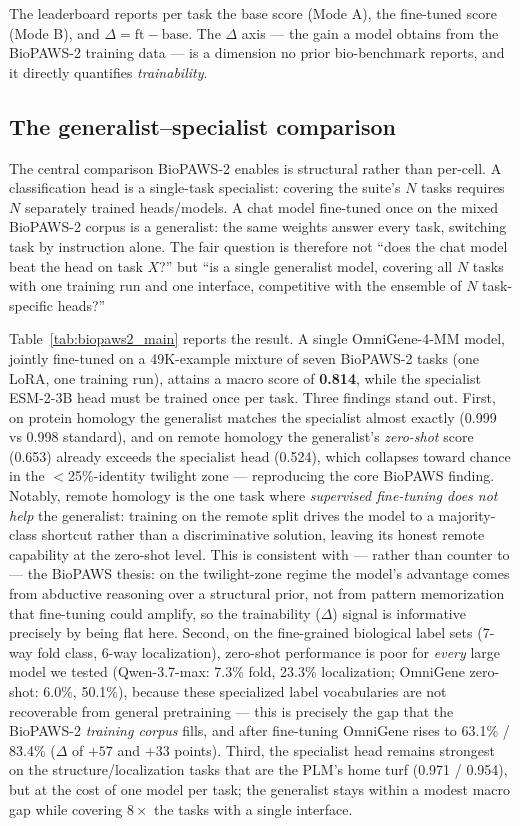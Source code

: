 The leaderboard reports per task the base score (Mode A), the fine-tuned score (Mode B),
and $\Delta = \text{ft} - \text{base}$. The $\Delta$ axis --- the gain a model obtains from
the BioPAWS-2 training data --- is a dimension no prior bio-benchmark reports, and it
directly quantifies \emph{trainability}.

\subsection{The generalist--specialist comparison}
\label{sec:biopaws2_generalist}

The central comparison BioPAWS-2 enables is structural rather than per-cell. A
classification head is a single-task specialist: covering the suite's $N$ tasks requires
$N$ separately trained heads/models. A chat model fine-tuned once on the mixed BioPAWS-2
corpus is a generalist: the same weights answer every task, switching task by instruction
alone. The fair question is therefore not ``does the chat model beat the head on task
$X$?'' but ``is a single generalist model, covering all $N$ tasks with one training run and
one interface, competitive with the ensemble of $N$ task-specific heads?''

Table~\ref{tab:biopaws2_main} reports the result. A single OmniGene-4-MM model, jointly
fine-tuned on a 49K-example mixture of seven BioPAWS-2 tasks (one LoRA, one training run),
attains a macro score of \textbf{0.814}, while the specialist ESM-2-3B head must be trained
once per task. Three findings stand out. First, on protein homology the generalist matches
the specialist almost exactly (0.999 vs 0.998 standard), and on remote homology the
generalist's \emph{zero-shot} score (0.653) already exceeds the specialist head (0.524),
which collapses toward chance in the $<$25\%-identity twilight zone --- reproducing the
core BioPAWS finding. Notably, remote homology is the one task where \emph{supervised
fine-tuning does not help} the generalist: training on the remote split drives the model to
a majority-class shortcut rather than a discriminative solution, leaving its honest remote
capability at the zero-shot level. This is consistent with --- rather than counter to ---
the BioPAWS thesis: on the twilight-zone regime the model's advantage comes from
abductive reasoning over a structural prior, not from pattern memorization that fine-tuning
could amplify, so the trainability ($\Delta$) signal is informative precisely by being flat
here. Second, on the fine-grained biological label sets (7-way fold class,
6-way localization), zero-shot performance is poor for \emph{every} large model we tested
(Qwen-3.7-max: 7.3\% fold, 23.3\% localization; OmniGene zero-shot: 6.0\%, 50.1\%), because
these specialized label vocabularies are not recoverable from general pretraining --- this
is precisely the gap that the BioPAWS-2 \emph{training corpus} fills, and after fine-tuning
OmniGene rises to 63.1\% / 83.4\% ($\Delta$ of $+57$ and $+33$ points). Third, the
specialist head remains strongest on the structure/localization tasks that are the PLM's
home turf (0.971 / 0.954), but at the cost of one model per task; the generalist stays
within a modest macro gap while covering $8\times$ the tasks with a single interface.

